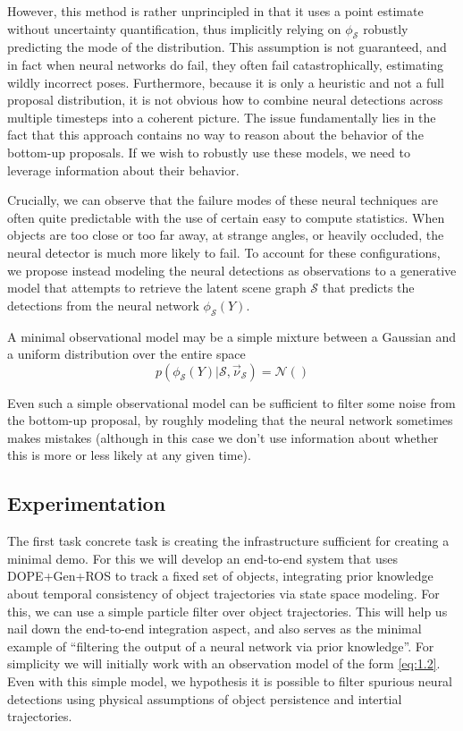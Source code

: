     However, this method is rather unprincipled in that it uses a point
    estimate without uncertainty quantification, thus implicitly relying on
    $\phi_\mathcal{S}$ robustly predicting the mode of the distribution. This
    assumption is not guaranteed, and in fact when neural networks do fail,
    they often fail catastrophically, estimating wildly incorrect poses.
    Furthermore, because it is only a heuristic and not a full proposal
    distribution, it is not obvious how to combine neural detections across
    multiple timesteps into a coherent picture.  The issue fundamentally lies
    in the fact that this approach contains no way to reason about the behavior
    of the bottom-up proposals.  If we wish to robustly use these models, we
    need to leverage information about their behavior.

    Crucially, we can observe that the failure modes of these neural techniques
    are often quite predictable with the use of certain easy to compute
    statistics. When objects are too close or too far away, at strange angles,
    or heavily occluded, the neural detector is much more likely to fail. To
    account for these configurations, we propose instead modeling the neural
    detections as observations to a generative model that attempts to retrieve
    the latent scene graph $\mathcal{S}$ that predicts the detections from the
    neural network $\phi_\mathcal{S}(Y)$.

    A minimal observational model may be a simple mixture between a Gaussian
    and a uniform distribution over the entire space
    \begin{equation} \label{eq:1.2}
      p(\phi_\mathcal{S}(Y) | \mathcal{S}, \vec{\nu}_\mathcal{S}) = \mathcal{N}()
    \end{equation}

    Even such a simple observational model can be sufficient to filter some
    noise from the bottom-up proposal, by roughly modeling that the neural
    network sometimes makes mistakes (although in this case we don't use
    information about whether this is more or less likely at any given time).

  \subsection{Experimentation}

    The first task concrete task is creating the infrastructure sufficient for
    creating a minimal demo. For this we will develop an end-to-end system that
    uses DOPE+Gen+ROS to track a fixed set of objects, integrating prior
    knowledge about temporal consistency of object trajectories via state space
    modeling. For this, we can use a simple particle filter over object
    trajectories. This will help us nail down the end-to-end integration
    aspect, and also serves as the minimal example of ``filtering the output of
    a neural network via prior knowledge''. For simplicity we will initially
    work with an observation model of the form \ref{eq:1.2}. Even with this
    simple model, we hypothesis it is possible to filter spurious neural
    detections using physical assumptions of object persistence and intertial
    trajectories.

